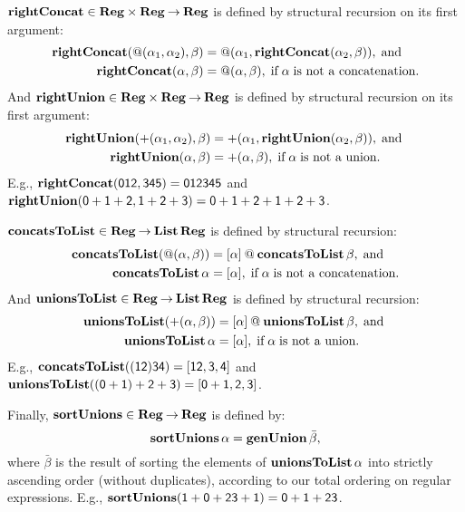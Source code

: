 $\mathbf{rightConcat}\in\mathbf{Reg}\times\mathbf{Reg}\mathbin{\to}\mathbf{Reg}$ is defined by
structural recursion on its first argument:
\begin{align*}
\mathbf{rightConcat}({@}(\alpha_1, \alpha_2), \beta) &=
{@}(\alpha_1, \mathbf{rightConcat}(\alpha_2, \beta)) , \;\allowbreak\mbox{and}\allowbreak\;\\
\mathbf{rightConcat}(\alpha, \beta) &= {@}(\alpha, \beta),
\;\allowbreak\mbox{if}\allowbreak\; \alpha \;\allowbreak\mbox{is not a concatenation}\allowbreak.
\end{align*}
And $\mathbf{rightUnion}\in\mathbf{Reg}\times\mathbf{Reg}\mathbin{\to}\mathbf{Reg}$ is defined by
structural recursion on its first argument:
\begin{align*}
\mathbf{rightUnion}({+}(\alpha_1, \alpha_2), \beta) &=
{+}(\alpha_1, \mathbf{rightUnion}(\alpha_2, \beta)) , \;\allowbreak\mbox{and}\allowbreak\; \\
\mathbf{rightUnion}(\alpha, \beta) &= {+}(\alpha, \beta),
\;\allowbreak\mbox{if}\allowbreak\; \alpha \;\allowbreak\mbox{is not a union}\allowbreak.
\end{align*}
E.g., $\mathbf{rightConcat}(\mathsf{012}, \mathsf{345}) =
\mathsf{012345}$ and $\mathbf{rightUnion}(\mathsf{0 + 1 + 2}, \mathsf{1 + 2 + 3}) =
\mathsf{0 + 1 + 2 + 1 + 2 + 3}$.

$\mathbf{concatsToList}\in\mathbf{Reg}\mathbin{\to}\mathbf{List}\,\mathbf{Reg}$ is defined by structural
recursion:
\begin{align*}
\mathbf{concatsToList}({@}(\alpha, \beta)) &=
[\alpha] \mathbin{@} \mathbf{concatsToList}\,\beta, \;\allowbreak\mbox{and}\allowbreak\; \\
\mathbf{concatsToList}\,\alpha &= [\alpha],
\;\allowbreak\mbox{if}\allowbreak\; \alpha \;\allowbreak\mbox{is not a concatenation}\allowbreak.
\end{align*}
And $\mathbf{unionsToList}\in\mathbf{Reg}\mathbin{\to}\mathbf{List}\,\mathbf{Reg}$ is defined by structural
recursion:
\begin{align*}
\mathbf{unionsToList}({+}(\alpha, \beta)) &=
[\alpha] \mathbin{@} \mathbf{unionsToList}\,\beta, \;\allowbreak\mbox{and}\allowbreak\; \\
\mathbf{unionsToList}\,\alpha &= [\alpha],
\;\allowbreak\mbox{if}\allowbreak\; \alpha \;\allowbreak\mbox{is not a union}\allowbreak.
\end{align*}
E.g., $\mathbf{concatsToList}(\mathsf{(12)34}) = [\mathsf{12, 3, 4}]$
and $\mathbf{unionsToList}(\mathsf{(0+1)+2+3}) = [\mathsf{0 + 1, 2, 3}]$.

Finally, $\mathbf{sortUnions}\in\mathbf{Reg}\mathbin{\to}\mathbf{Reg}$ is defined by:
\begin{displaymath}
\mathbf{sortUnions}\,\alpha = \mathbf{genUnion}\,\bar{\beta} ,
\end{displaymath}
where $\bar{\beta}$ is the result of sorting the elements of
$\mathbf{unionsToList}\,\alpha$ into strictly ascending order (without
duplicates), according to our total ordering on regular expressions.
E.g., $\mathbf{sortUnions}(\mathsf{1 + 0 + 23 + 1}) = \mathsf{0 + 1 + 23}$.

